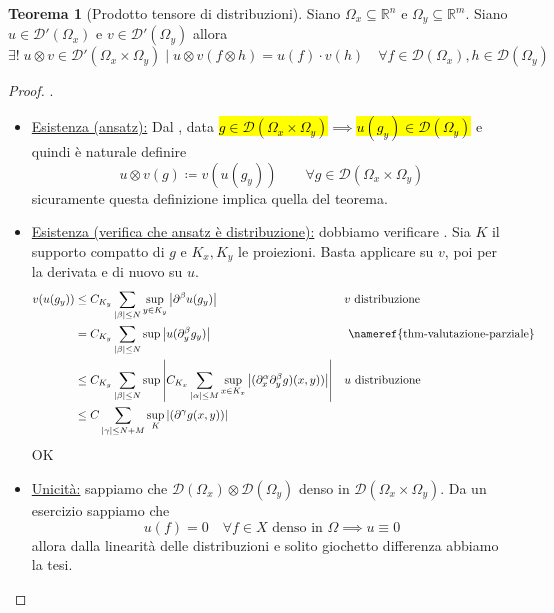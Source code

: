 \documentclass[a4paper,10pt]{article}
\theoremstyle{definition}
\newcommand{\re}{\mathbb{R}} %
\theoremstyle{indentdefinition}
\theoremstyle{indenttheorem}
\newtheorem{thm}{Teorema}
\theoremstyle{myremark}
\theoremstyle{indentgeneral}
\newenvironment{myboxed} 
{\noindent\begin{lrbox}{\mybox}\begin{minipage}{\textwidth}}
{\end{minipage}\end{lrbox}\fbox{\usebox{\mybox}}}
\begin{document}
\begin{myboxed}
    \begin{thm}[Prodotto tensore di distribuzioni]\label{thm-prodotto-tensore-distribuzioni}
        Siano $\Omega_x\subseteq \re^n$ e $\Omega_y\subseteq \re^m$. Siano $u\in \mathcal{D}'(\Omega_x)$ e $v\in \mathcal{D}'(\Omega_y)$ allora
        $$\exists!\; u\otimes v\in \mathcal{D}'(\Omega_x\times \Omega_y)\mid \boxed{u\otimes v(f\otimes h)=u(f)\cdot v(h)}\quad \forall f\in \mathcal{D}(\Omega_x),h\in \mathcal{D}(\Omega_y)$$
    \end{thm}
\end{myboxed}
\begin{proof}.
\begin{itemize}
    \item \underline{Esistenza (ansatz):} Dal , data \hl{$g\in \mathcal{D}(\Omega_x\times\Omega_y)$}$\implies $\hl{$u(g_y)\in\mathcal{D}(\Omega_y)$} e quindi è naturale definire
    $$\boxed{u\otimes v(g)\coloneqq v(u(g_y))}\qquad\forall g\in \mathcal{D}(\Omega_x\times\Omega_y)$$
    sicuramente questa definizione implica quella del teorema.
    \item \underline{Esistenza (verifica che ansatz è distribuzione):} dobbiamo verificare . Sia $K$ il supporto compatto di $g$ e $K_x,K_y$ le proiezioni. Basta applicare  su $v$, poi  per la derivata e di nuovo  su $u$.
    \begin{align*}
        v(u(g_y)) &\le C_{K_y}\sum_{\abs{\beta}\le N}\sup_{y\in K_y}\abs{\partial^\beta u(g_y)} && v \text{ distribuzione}\\
         &= C_{K_y}\sum_{\abs{\beta}\le N}\sup\abs{u(\partial_y^\beta g_y)} && \text{ \nameref{thm-valutazione-parziale}}\\
         &\le C_{K_y}\sum_{\abs{\beta}\le N}\sup\abs{C_{K_x}\sum_{\abs{\alpha}\le M}\sup_{x\in K_x}\abs{(\partial^\alpha_x\partial^\beta_yg)(x,y))}} && u\text{ distribuzione}\\
         &\le C\sum_{\abs{\gamma}\le N+M}\sup_{K}\abs{(\partial^\gamma g(x,y))}
    \end{align*}
    OK
    \item \underline{Unicità:} sappiamo che $\mathcal{D}(\Omega_x)\otimes\mathcal{D}(\Omega_y)$ denso in $\mathcal{D}(\Omega_x\times \Omega_y)$. Da un esercizio sappiamo che
    $$u(f)=0 \quad \forall f\in X\text{ denso in }\Omega\implies u\equiv0$$
    allora dalla linearità delle distribuzioni e solito giochetto differenza abbiamo la tesi.
\end{itemize}
    
\end{proof}
\end{document}
